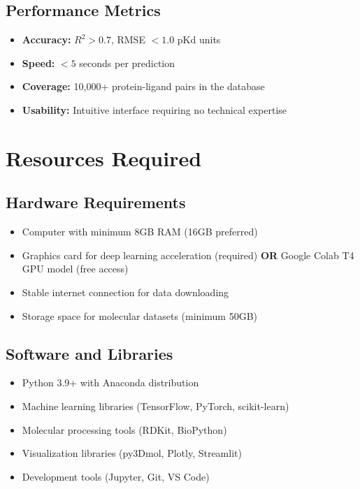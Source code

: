 \documentclass[12pt,a4paper]{article}
\begin{document}
\subsection{Performance Metrics}
\begin{itemize}
    \item \textbf{Accuracy:} $R^2 > 0.7$, RMSE $< 1.0$ pKd units
    \item \textbf{Speed:} $< 5$ seconds per prediction
    \item \textbf{Coverage:} 10,000+ protein-ligand pairs in the database
    \item \textbf{Usability:} Intuitive interface requiring no technical expertise
\end{itemize}

\section{Resources Required}

\subsection{Hardware Requirements}
\begin{itemize}
    \item Computer with minimum 8GB RAM (16GB preferred)
    \item Graphics card for deep learning acceleration (required) \textbf{OR} Google Colab T4 GPU model (free access)
    \item Stable internet connection for data downloading
    \item Storage space for molecular datasets (minimum 50GB)
\end{itemize}

\subsection{Software and Libraries}
\begin{itemize}
    \item Python 3.9+ with Anaconda distribution
    \item Machine learning libraries (TensorFlow, PyTorch, scikit-learn)
    \item Molecular processing tools (RDKit, BioPython)
    \item Visualization libraries (py3Dmol, Plotly, Streamlit)
    \item Development tools (Jupyter, Git, VS Code)
\end{itemize}
\end{document}
